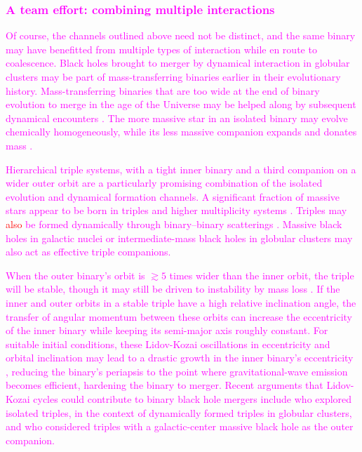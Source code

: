 \documentclass[iop,onecolumn]{revtex4}
\newcommand{\ajf}[1]{\textcolor{red}{#1}}
\newcommand{\ilya}[1]{\textcolor{magenta}{#1}}
\begin{document}
\subsubsection{\ilya{A team effort: combining multiple interactions}}

\ilya{Of course, the channels outlined above need not be distinct, and the same binary may have benefitted from multiple types of interaction while en route to coalescence.  Black holes brought to merger by dynamical interaction in globular clusters may be part of mass-transferring binaries earlier in their evolutionary history.  Mass-transferring binaries that are too wide at the end of binary evolution to merge in the age of the Universe may be helped along by subsequent dynamical encounters \citep[e.g.,][]{Belczynski:2014VMS}.  The more massive star in an isolated binary may evolve chemically homogeneously, while its less massive companion expands and donates mass \citep{Marchant:2017}.}

\ilya{Hierarchical triple systems, with a tight inner binary and a third companion on a wider outer orbit are a particularly promising combination of the isolated evolution and dynamical formation channels.  A significant fraction of massive stars appear to be born in triples and higher multiplicity systems \citep{DucheneKraus:2013}.  Triples may \ajf{also} be formed dynamically through binary--binary scatterings \citep{MillerHamilton:2002b}.  Massive black holes in galactic nuclei or intermediate-mass black holes in globular clusters may also act as effective triple companions.}   

\ilya{When the outer binary's orbit is $\gtrsim 5$ times wider than the inner orbit, the triple will be stable, though it may still be driven to instability by mass loss \citep[e.g.,][]{PeretsKratter:2012}.  If the inner and outer orbits in a stable triple have a high relative inclination angle, the transfer of angular momentum between these orbits can increase the eccentricity of the inner binary while keeping its semi-major axis roughly constant. For suitable initial conditions, these Lidov-Kozai oscillations in eccentricity and orbital inclination \citep{Lidov:1962,Kozai:1962} may lead to a drastic growth in the inner binary's eccentricity \citep[for a review, see][]{Naoz:2016}, reducing the binary's periapsis to the point where gravitational-wave emission becomes efficient, hardening the binary to merger.  Recent arguments that Lidov-Kozai cycles could contribute to binary black hole mergers include \citet{SilbeeTremaine:2017} who explored isolated triples, \citet{Antonini:2016} in the context of dynamically formed triples in globular clusters, and \citet{Hoang:2018} who considered triples with a galactic-center massive black hole as the outer companion.}
\end{document}

